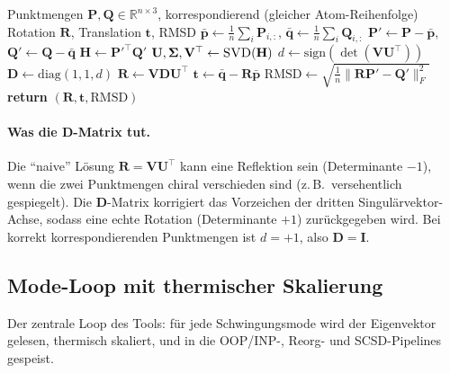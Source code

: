\documentclass[11pt,a4paper,twoside]{article}
\theoremstyle{remark}
\begin{document}
\begin{algorithm}[H]
\caption{\textsc{KabschAlign}}
\begin{algorithmic}[1]
\Require Punktmengen $\mathbf{P}, \mathbf{Q} \in \mathbb{R}^{n\times 3}$,
         korrespondierend (gleicher Atom-Reihenfolge)
\Ensure Rotation $\mathbf{R}$, Translation $\mathbf{t}$, RMSD
\State $\bar{\mathbf{p}} \gets \frac{1}{n}\sum_i \mathbf{P}_{i,:}$,
       $\bar{\mathbf{q}} \gets \frac{1}{n}\sum_i \mathbf{Q}_{i,:}$
\State $\mathbf{P}' \gets \mathbf{P} - \bar{\mathbf{p}}$,
       $\mathbf{Q}' \gets \mathbf{Q} - \bar{\mathbf{q}}$
\State $\mathbf{H} \gets \mathbf{P}'^\top \mathbf{Q}'$
\State $\mathbf{U}, \boldsymbol{\Sigma}, \mathbf{V}^\top \gets
       \textsc{SVD}(\mathbf{H})$
\State $d \gets \text{sign}(\det(\mathbf{V} \mathbf{U}^\top))$
\State $\mathbf{D} \gets \text{diag}(1, 1, d)$
\State $\mathbf{R} \gets \mathbf{V} \mathbf{D} \mathbf{U}^\top$
\State $\mathbf{t} \gets \bar{\mathbf{q}} - \mathbf{R} \bar{\mathbf{p}}$
\State $\text{RMSD} \gets \sqrt{\frac{1}{n} \|\mathbf{R}\mathbf{P}' -
       \mathbf{Q}'\|_F^2}$
\State \textbf{return} $(\mathbf{R}, \mathbf{t}, \text{RMSD})$
\end{algorithmic}
\end{algorithm}

\paragraph{Was die $\mathbf{D}$-Matrix tut.}
Die "`naive"' L\"osung $\mathbf{R} = \mathbf{V}\mathbf{U}^\top$ kann
eine Reflektion sein (Determinante $-1$), wenn die zwei Punktmengen
chiral verschieden sind (z.\,B.\ versehentlich gespiegelt). Die
$\mathbf{D}$-Matrix korrigiert das Vorzeichen der dritten Singul\"arvektor-
Achse, sodass eine echte Rotation (Determinante $+1$) zur\"uckgegeben
wird. Bei korrekt korrespondierenden Punktmengen ist $d = +1$, also
$\mathbf{D} = \mathbf{I}$.

\subsection{Mode-Loop mit thermischer Skalierung}
\label{app:pseudo-mode-loop}

Der zentrale Loop des Tools: f\"ur jede Schwingungsmode wird der
Eigenvektor gelesen, thermisch skaliert, und in die OOP/INP-,
Reorg- und SCSD-Pipelines gespeist.
\end{document}
